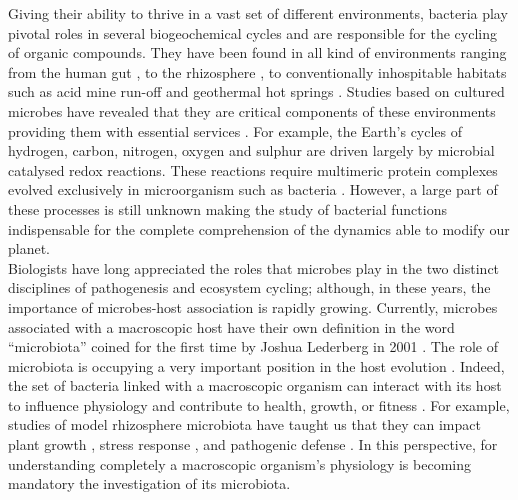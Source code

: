 Giving their ability to thrive in a vast set of different environments, bacteria play pivotal roles in several biogeochemical cycles and are responsible for the cycling of organic compounds. They have been found in all kind of environments ranging from the human gut \cite{walter2011human}, to the rhizosphere \cite{philippot2013going}, to conventionally inhospitable habitats such as acid mine run-off \cite{simmons2008population} and geothermal hot springs 	\cite{sharp2014humboldt}. Studies based on cultured microbes have revealed that they are critical components of these environments providing them with essential services \cite{van2008unseen, arrigo2004marine}. For example, the Earth's cycles of hydrogen, carbon, nitrogen, oxygen and sulphur are driven largely by microbial catalysed redox reactions. These reactions require multimeric protein complexes evolved exclusively in microorganism such as bacteria \cite{falkowski2008microbial}. However, a large part of these processes is still unknown making the study of bacterial functions indispensable for the complete comprehension of the dynamics able to modify our planet.\\
Biologists have long appreciated the roles that microbes play in the two distinct disciplines of pathogenesis and ecosystem cycling; although, in these years, the importance of microbes-host association is rapidly growing. Currently, microbes associated with a macroscopic host have their own definition in the word ``microbiota'' coined for the first time by Joshua Lederberg in 2001 \citep{lederberg2001scientist}. The role of microbiota is occupying a very important position in the host evolution \cite{ley2008evolution}. Indeed, the set of bacteria linked with a macroscopic organism can interact with its host to influence physiology and contribute to health, growth, or fitness \citep{dimkpa2009plant, hooper2012interactions}. For example, studies of model rhizosphere microbiota have taught us that they can impact plant growth \citep{kennedy2007competitive}, stress response \cite{redman2002thermotolerance, yang2009rhizosphere}, and pathogenic defense \cite{cook1995molecular}. In this perspective, for understanding completely a macroscopic organism’s physiology is becoming mandatory the investigation of its microbiota.\\
